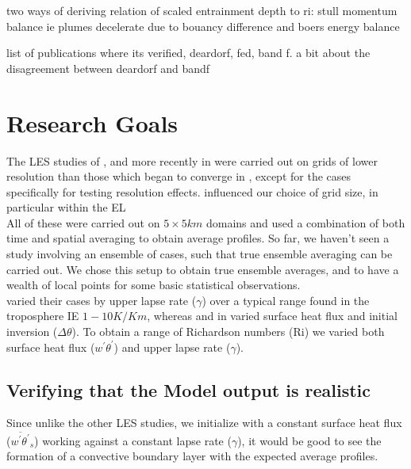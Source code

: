 two ways of deriving relation of scaled entrainment depth to ri: stull momentum balance ie plumes decelerate due to bouancy difference
and boers energy balance

list of publications where its verified, deardorf, fed, band f.  a bit about the disagreement between deardorf and bandf

\section{Research Goals}
\label{sec:ResearchGoals}

The LES studies of \citeauthor{SullMoengStev} \cite{SullMoengStev}, \citeauthor{FedConzMir04} \cite{FedConzMir04} and more recently \citeauthor{BrooksFowler2} in \cite{BrooksFowler2} were carried out on grids of lower resolution than those which began to converge in \citeauthor{SullPat} \cite{SullPat}, except for the cases specifically for testing resolution effects. \citeauthor{SullPat} \cite{SullPat} influenced our choice of grid size, in particular within the \acs{EL}\\

 All of these were carried out on $5 \times 5 km$ domains and used a combination of both time and spatial averaging to obtain average profiles.  So far, we haven't seen a study involving an ensemble of cases, such that true ensemble averaging can be carried out.  We chose this setup to obtain true ensemble averages, and to have a wealth of local points for some basic statistical observations.\\

\citeauthor{FedConzMir04} \cite{FedConzMir04} varied their cases by upper lapse rate ($\gamma$) over a typical range found in the troposphere IE $1 - 10 K / Km$, whereas \citeauthor{SullMoengStev} \cite{SullMoengStev} and \citeauthor{BrooksFowler2} in \cite{BrooksFowler2} varied surface heat flux and initial inversion ($\Delta \theta$).  To obtain a range of Richardson numbers (\acs{Ri}) we varied both surface heat flux ($w^{'}\theta^{'}$) and upper lapse rate ($\gamma$).\\

\subsection{Verifying that the Model output is realistic}

Since unlike the other LES studies, we initialize with a constant surface heat flux ($\overline{w^{'}\theta^{'}}_{s}$) working against a constant lapse rate ($\gamma$), it would be good to see the formation of a convective boundary layer with the expected average profiles.\\

